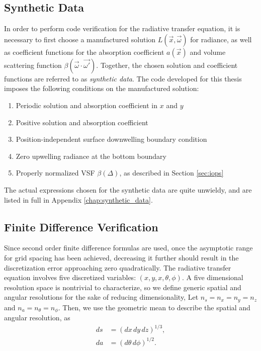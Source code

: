 \subsection{Synthetic Data}
\label{sec:synthetic_data}
In order to perform code verification for the radiative transfer equation, it is necessary to first choose a manufactured solution $L(\vec{x}, \vec{\omega})$ for radiance, as well as coefficient functions for the absorption coefficient $a(\vec{x})$ and volume scattering function $\beta(\vec{\omega}\cdot\vec{\omega'})$.
Together, the chosen solution and coefficient functions are referred to as \textit{synthetic data}.
The code developed for this thesis imposes the following conditions on the manufactured solution:
\begin{enumerate}
  \item Periodic solution and absorption coefficient in $x$ and $y$
  \item Positive solution and absorption coefficient
  \item Position-independent surface downwelling boundary condition
  \item Zero upwelling radiance at the bottom boundary
  \item Properly normalized VSF $\beta(\Delta)$, as described in Section \ref{sec:iops}
\end{enumerate}
The actual expressions chosen for the synthetic data are quite unwieldy, and are listed in full in Appendix \ref{chap:synthetic_data}.


\subsection{Finite Difference Verification}
Since second order finite difference formulas are used, once the asymptotic range for grid spacing has been achieved, decreasing it further should result in the discretization error approaching zero quadratically.
The radiative transfer equation involves five discretized variables: $(x,y,x,\theta,\phi)$.
A five dimensional resolution space is nontrivial to characterize, so we define generic spatial and angular resolutions for the sake of reducing dimensionality,
Let $n_s = n_x = n_y = n_z$ and $n_a = n_\theta = n_\phi$.
Then, we use the geometric mean to describe the spatial and angular resolution, as
\begin{align}
  ds &= (dx\, dy\, dz)^{1/3}, \label{eqn:ds}\\
  da &= (d\theta\, d\phi)^{1/2}.
  \label{eqn:da}
\end{align}

